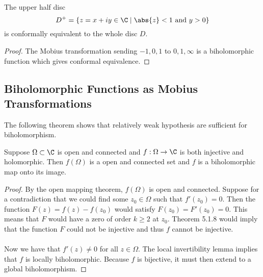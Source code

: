 \documentclass[a4paper]{article}
\begin{document}
\begin{prp}{}{} The upper half disc $$D^+=\{z=x+iy\in\C\;|\;\abs{z}<1\text{ and }y>0\}$$ is conformally equivalent to the whole disc $D$. \tcbline
\begin{proof}
The Mobius transformation sending $-1,0,1$ to $0,1,\infty$ is a biholomorphic function which gives conformal equivalence. 
\end{proof}
\end{prp}

\subsection{Biholomorphic Functions as Mobius Transformations}
The following theorem shows that relatively weak hypothesis are sufficient for biholomorphism. 

\begin{thm}{}{} Suppose $\Omega\subset\C$ is open and connected and $f:\Omega\to\C$ is both injective and holomorphic. Then $f(\Omega)$ is a open and connected set and $f$ is a biholomorphic map onto its image. \tcbline
\begin{proof}
By the open mapping theorem, $f(\Omega)$ is open and connected. Suppose for a contradiction that we could find some $z_0\in\Omega$ such that $f'(z_0)=0$. Then the function $F(z)=f(z)-f(z_0)$ would satisfy $F(z_0)=F'(z_0)=0$. This means that $F$ would have a zero of order $k\geq 2$ at $z_0$. Theorem 5.1.8 would imply that the function $F$ could not be injective and thus $f$ cannot be injective. \\~\\

Now we have that $f'(z)\neq 0$ for all $z\in\Omega$. The local invertibility lemma implies that $f$ is locally biholomorphic. Because $f$ is bijective, it must then extend to a global biholomorphism. 
\end{proof}
\end{thm}
\end{document}
